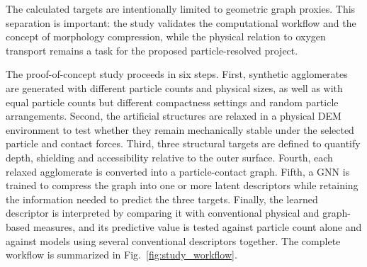 \documentclass[12pt,a4paper]{article}
\begin{document}
The calculated targets are intentionally limited to geometric graph proxies.
This separation is important: the study validates the computational workflow
and the concept of morphology compression, while the physical relation to
oxygen transport remains a task for the proposed particle-resolved project.

The proof-of-concept study proceeds in six steps. First, synthetic
agglomerates are generated with different particle counts and physical sizes,
as well as with equal particle counts but different compactness settings and
random particle arrangements. Second, the artificial structures are relaxed
in a physical DEM environment to test whether they remain mechanically stable
under the selected particle and contact forces. Third, three structural
targets are defined to quantify depth, shielding and accessibility relative to
the outer surface. Fourth, each relaxed agglomerate is converted into a
particle-contact graph. Fifth, a GNN is trained to compress the graph into one
or more latent descriptors while retaining the information needed to predict
the three targets. Finally, the learned descriptor is interpreted by comparing
it with conventional physical and graph-based measures, and its predictive
value is tested against particle count alone and against models using several
conventional descriptors together. The complete workflow is summarized in
Fig.~\ref{fig:study_workflow}.
\end{document}
